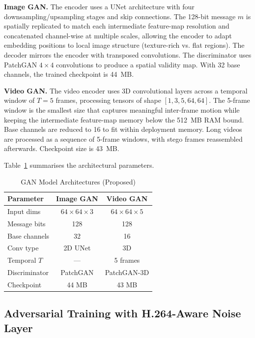 \documentclass[conference]{IEEEtran}
\begin{document}
\textbf{Image GAN.} The encoder uses a UNet architecture
with four downsampling/upsampling stages and skip connections. The
128-bit message $m$ is spatially replicated to match each
intermediate feature-map resolution and concatenated channel-wise at
multiple scales, allowing the encoder to adapt embedding positions
to local image structure (texture-rich vs. flat regions). The
decoder mirrors the encoder with transposed convolutions. The
discriminator uses PatchGAN $4{\times}4$ convolutions to produce a
spatial validity map. With 32 base channels, the trained checkpoint
is 44~MB.

\textbf{Video GAN.} The video encoder uses 3D convolutional layers
across a temporal window of $T{=}5$ frames, processing tensors of
shape $[1, 3, 5, 64, 64]$. The 5-frame window is the smallest size
that captures meaningful inter-frame motion while keeping the
intermediate feature-map memory below the 512~MB RAM bound. Base
channels are reduced to 16 to fit within deployment memory. Long
videos are processed as a sequence of 5-frame windows, with stego
frames reassembled afterwards. Checkpoint size is 43~MB.

Table~\ref{tab_models} summarises the architectural parameters.

\begin{table}[htbp]
\caption{GAN Model Architectures (Proposed)}
\begin{center}
\begin{tabular}{|l|c|c|}
\hline
\textbf{Parameter}   & \textbf{Image GAN} & \textbf{Video GAN} \\
\hline
Input dims     & $64{\times}64{\times}3$ & $64{\times}64{\times}5$ \\
Message bits   & 128 & 128 \\
Base channels  & 32  & 16  \\
Conv type      & 2D UNet & 3D  \\
Temporal $T$   & --- & 5 frames \\
Discriminator  & PatchGAN & PatchGAN-3D \\
Checkpoint     & 44 MB & 43 MB \\
\hline
\end{tabular}
\label{tab_models}
\end{center}
\end{table}

\subsection{Adversarial Training with H.264-Aware Noise Layer}
\end{document}
